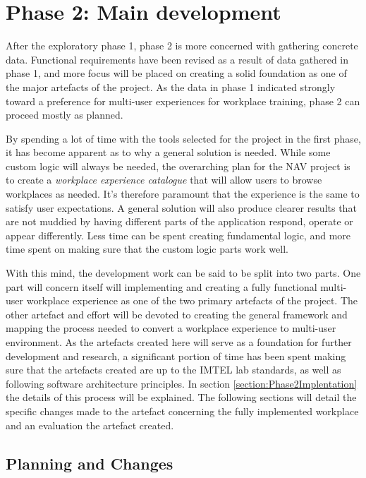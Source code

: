 
\chapter{Phase 2:  Main development}
\label{chap:phase2}

After the exploratory phase 1, phase 2 is more concerned with gathering concrete data. Functional requirements have been revised as a result of data gathered in phase 1, and more focus will be placed on creating a solid foundation as one of the major artefacts of the project. As the data in phase 1 indicated strongly toward a preference for multi-user experiences for workplace training, phase 2 can proceed mostly as planned.

By spending a lot of time with the tools selected for the project in the first phase, it has become apparent as to why a general solution is needed. While some custom logic will always be needed, the overarching plan for the NAV project is to create a \textit{workplace experience catalogue} that will allow users to browse workplaces as needed. It's therefore paramount that the experience is the same to satisfy user expectations. A general solution will also produce clearer results that are not muddied by having different parts of the application respond, operate or appear differently. Less time can be spent creating fundamental logic, and more time spent on making sure that the custom logic parts work well.

With this mind, the development work can be said to be split into two parts. One part will concern itself will implementing and creating a fully functional multi-user workplace experience as one of the two primary artefacts of the project. The other artefact and effort will be devoted to creating the general framework and mapping the process needed to convert a workplace experience to multi-user environment. As the artefacts created here will serve as a foundation for further development and research, a significant portion of time has been spent making sure that the artefacts created are up to the IMTEL lab standards, as well as following software architecture principles. In section \ref{section:Phase2Implentation} the details of this process will be explained. The following sections will detail the specific changes made to the artefact concerning the fully implemented workplace and an evaluation the artefact created.


\section{Planning and Changes}


